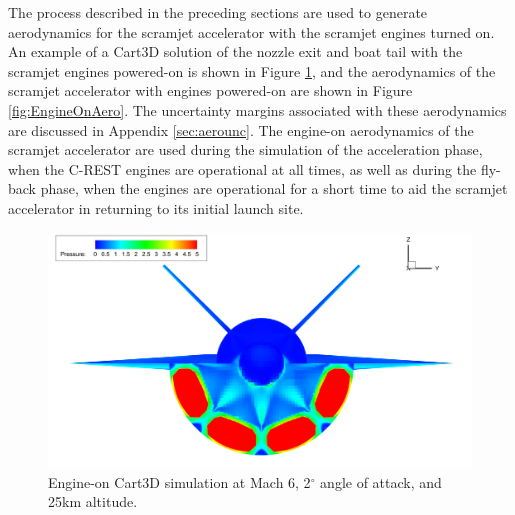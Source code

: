 The process described in the preceding sections are used to generate aerodynamics for the scramjet accelerator with the scramjet engines turned on. An example of a Cart3D solution of the nozzle exit and boat tail with the scramjet engines powered-on is shown in Figure \ref{fig:EngineOn}, and the aerodynamics of the scramjet accelerator with engines powered-on are shown in Figure \ref{fig:EngineOnAero}. The uncertainty margins associated with these aerodynamics are discussed in Appendix \ref{sec:aerounc}.
		The engine-on aerodynamics of the scramjet accelerator are used during the simulation of the acceleration phase, when the C-REST engines are operational at all times, as well as during the fly-back phase, when the engines are operational for a short time to aid the scramjet accelerator in returning to its initial launch site.
		
		
		\begin{figure}[ht]
			\centering
			\includegraphics[width=0.9\linewidth]{figures/3_vehicle_design/EngineOn}
			\caption{Engine-on Cart3D simulation at Mach 6, 2$^\circ$ angle of attack, and 25km altitude.}
			\label{fig:EngineOn}
		\end{figure}
		
